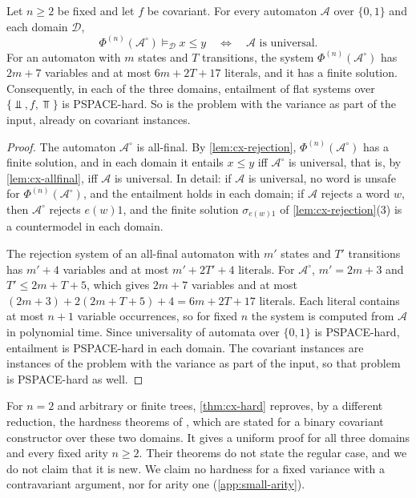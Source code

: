 \begin{theorem}\label{thm:cx-hard}
Let $n\ge2$ be fixed and let $f$ be covariant. For every automaton
$\mathcal A$ over $\{0,1\}$ and each domain $\mathcal D$,
\[
 \Phi^{(n)}(\mathcal A^\circ)\models_{\mathcal D}x\le y
 \quad\Longleftrightarrow\quad
 \mathcal A\text{ is universal}.
\]
For an automaton with $m$ states and $T$ transitions, the system
$\Phi^{(n)}(\mathcal A^\circ)$ has $2m+7$ variables and at most $6m+2T+17$
literals, and it has a finite solution. Consequently, in each of the three
domains, entailment of flat systems over $\{\Bot,f,\Top\}$ is PSPACE-hard. So
is the problem with the variance as part of the input, already on covariant
instances.
\end{theorem}

\begin{proof}
The automaton $\mathcal A^\circ$ is all-final. By \cref{lem:cx-rejection},
$\Phi^{(n)}(\mathcal A^\circ)$ has a finite solution, and in each domain it
entails $x\le y$ iff $\mathcal A^\circ$ is universal, that is, by
\cref{lem:cx-allfinal}, iff $\mathcal A$ is universal. In detail: if
$\mathcal A$ is universal, no word is unsafe for
$\Phi^{(n)}(\mathcal A^\circ)$, and the entailment holds in each domain; if
$\mathcal A$ rejects a word $w$, then $\mathcal A^\circ$ rejects $e(w)1$, and
the finite solution $\sigma_{e(w)1}$ of \cref{lem:cx-rejection}(3) is a
countermodel in each domain.

The rejection system of an all-final automaton with $m'$ states and $T'$
transitions has $m'+4$ variables and at most $m'+2T'+4$ literals. For
$\mathcal A^\circ$, $m'=2m+3$ and $T'\le2m+T+5$, which gives $2m+7$ variables
and at most $(2m+3)+2(2m+T+5)+4=6m+2T+17$ literals. Each literal contains at
most $n+1$ variable occurrences, so for fixed $n$ the system is computed
from $\mathcal A$ in polynomial time. Since universality of automata over
$\{0,1\}$ is PSPACE-hard, entailment is PSPACE-hard in each domain. The
covariant instances are instances of the problem with the variance as part
of the input, so that problem is PSPACE-hard as well.
\end{proof}

For $n=2$ and arbitrary or finite trees, \cref{thm:cx-hard} reproves, by a
different reduction, the hardness theorems of
\citet[Theorems~1 and~2]{HengleinRehof98}, which are stated for a binary
covariant constructor over these two domains. It gives a uniform proof for
all three domains and every fixed arity $n\ge2$. Their theorems do not state
the regular case, and we do not claim that it is new. We claim no hardness
for a fixed variance with a contravariant argument, nor for arity one
(\cref{app:small-arity}).


